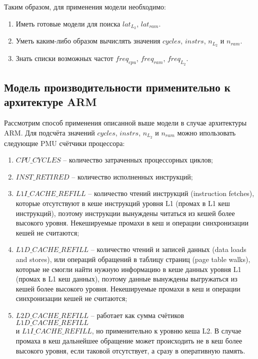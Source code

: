     Таким образом, для применения модели необходимо:
    \begin{enumerate}
        \item Иметь готовые модели для поиска $lat_{L_2}$, $lat_{ram}$.
        \item Уметь каким-либо образом вычислять значения $cycles$, $instrs$, $n_{L_2}$ и $n_{ram}$.
        \item Знать списки возможных частот $freq_{cpu}$, $freq_{ram}$, $freq_{L_2}$.
    \end{enumerate}

\subsection{Модель производительности применительно к архитектуре ARM}

    Рассмотрим способ применения описанной выше модели в случае архитектуры ARM.
    Для подсчёта значений $cycles$, $instrs$, $n_{L_2}$ и $n_{ram}$ можно ипользовать
    следующие PMU счётчики процессора:
    \begin{enumerate}
        \item $CPU\_CYCLES$ -- количество затраченных процессорных циклов;
        \item $INST\_RETIRED$ -- количество исполненных инструкций;
        \item $L1I\_CACHE\_REFILL$ -- количество чтений инструкций (instruction fetches),
        которые отсутствуют в кеше инструкций уровня L1 (промах в L1 кеш инструкций),
        поэтому инструкции вынуждены читаться из кешей более высокого уровня.
        Некешируемые промахи в кеш и операции синхронизации кешей не считаются;
        \item $L1D\_CACHE\_REFILL$ -- количество чтений и записей данных (data loads and stores),
        или операций обращений в таблицу страниц (page table walks), которые не смогли
        найти нужную информацию в кеше данных уровня L1 (промах в L1 кеш данных),
        поэтому данные вынуждены выгружаться из кешей более высокого уровня.
        Некешируемые промахи в кеш и операции синхронизации кешей не считаются;
        \item $L2D\_CACHE\_REFILL$ -- работает как сумма счётиков $L1D\_CACHE\_REFILL$ \\ и
        $L1I\_CACHE\_REFILL$, но применительно к уровню кеша L2. В случае промаха в кеш дальнейшее
        обращение может происходить не в кеш более высокого уровня, если таковой отсутствует,
        а сразу в оперативную память.
    \end{enumerate}

